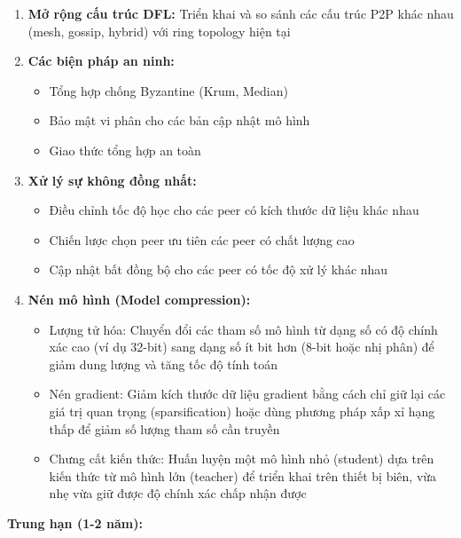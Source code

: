 \begin{enumerate}
    \item \textbf{Mở rộng cấu trúc DFL:} Triển khai và so sánh các cấu trúc P2P khác nhau (mesh, gossip, hybrid) với ring topology hiện tại
    \item \textbf{Các biện pháp an ninh:} 
        \begin{itemize}
            \item Tổng hợp chống Byzantine (Krum, Median)
            \item Bảo mật vi phân cho các bản cập nhật mô hình
            \item Giao thức tổng hợp an toàn
        \end{itemize}
    \item \textbf{Xử lý sự không đồng nhất:}
        \begin{itemize}
            \item Điều chỉnh tốc độ học cho các peer có kích thước dữ liệu khác nhau
            \item Chiến lược chọn peer ưu tiên các peer có chất lượng cao
            \item Cập nhật bất đồng bộ cho các peer có tốc độ xử lý khác nhau
        \end{itemize}
    \item \textbf{Nén mô hình (Model compression):}
        \begin{itemize}
            \item Lượng tử hóa: Chuyển đổi các tham số mô hình từ dạng số có độ chính xác cao (ví dụ 32-bit) sang dạng số ít bit hơn (8-bit hoặc nhị phân) để giảm dung lượng và tăng tốc độ tính toán
            \item Nén gradient: Giảm kích thước dữ liệu gradient bằng cách chỉ giữ lại các giá trị quan trọng (sparsification) hoặc dùng phương pháp xấp xỉ hạng thấp để giảm số lượng tham số cần truyền
            \item Chưng cất kiến thức: Huấn luyện một mô hình nhỏ (student) dựa trên kiến thức từ mô hình lớn (teacher) để triển khai trên thiết bị biên, vừa nhẹ vừa giữ được độ chính xác chấp nhận được
        \end{itemize}
\end{enumerate}

\textbf{Trung hạn (1-2 năm):}

